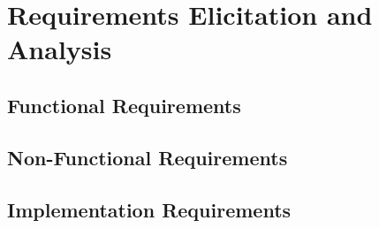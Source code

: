 \documentclass{scrartcl}
\begin{document}
\section{Requirements Elicitation and Analysis}\label{requirements}

\subsection{Functional Requirements}\label{functional-requirements}


\subsection{Non-Functional Requirements}\label{non-functional-requirements}

\subsection{Implementation Requirements}\label{implementation-requirements}
\end{document}
